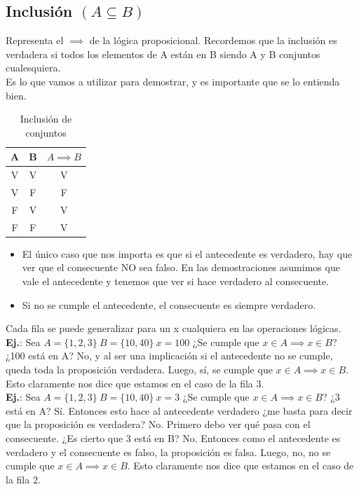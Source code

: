 \documentclass[10pt,a4paper]{article}
\begin{document}
\subsection*{Inclusión $(A \subseteq B)$}
Representa el $\implies$ de la lógica proposicional. Recordemos que la inclusión es verdadera si todos los elementos de A están en B siendo A y B conjuntos cualesquiera. \\
Es lo que vamos a utilizar para demostrar, y es importante que se lo entienda bien. 
\begin{table}[h!]
    \centering
    \begin{tabular}{|c | c | c|}
    \hline
    \textbf{A} & \textbf{B} & \textbf{$A \implies B$} \\[0.1cm]
    \hline
    V & V & V \\
    V & F & F \\
    F & V & V \\
    F & F & V \\
    \hline
    \end{tabular}
    \caption{Inclusión de conjuntos}
\end{table} 
\begin{itemize}
    \item El único caso que nos importa es que si el antecedente es verdadero, hay que ver que el consecuente NO sea falso. En las demostraciones asumimos que vale el antecedente y tenemos que ver si hace verdadero al consecuente.
    \item Si no se cumple el antecedente, el consecuente es siempre verdadero.
\end{itemize}
Cada fila se puede generalizar para un x cualquiera en las operaciones lógicas. \\
\textbf{Ej.}: Sea $A = \{1, 2, 3\} \ B = \{10, 40\} \ x = 100$ ¿Se cumple que $ x \in A \implies x \in B$? ¿100 está en A? No, y al ser una implicación si el antecedente no se cumple, queda toda la proposición verdadera. Luego, sí, se cumple que $ x \in A \implies x \in B$. Esto claramente nos dice que estamos en el caso de la fila 3. \\ 
\textbf{Ej.}: Sea $A = \{1, 2, 3\} \ B = \{10, 40\} \ x = 3$ ¿Se cumple que $ x \in A \implies x \in B$? ¿3 está en A? Sí. Entonces esto hace al antecedente verdadero ¿me basta para decir que la proposición es verdadera? No. Primero debo ver qué pasa con el consecuente. ¿Es cierto que 3 está en B? No. Entonces como el antecedente es verdadero y el consecuente es falso, la proposición es falsa. Luego, no, no se cumple que $ x \in A \implies x \in B$. Esto claramente nos dice que estamos en el caso de la fila 2. \\
\end{document}
